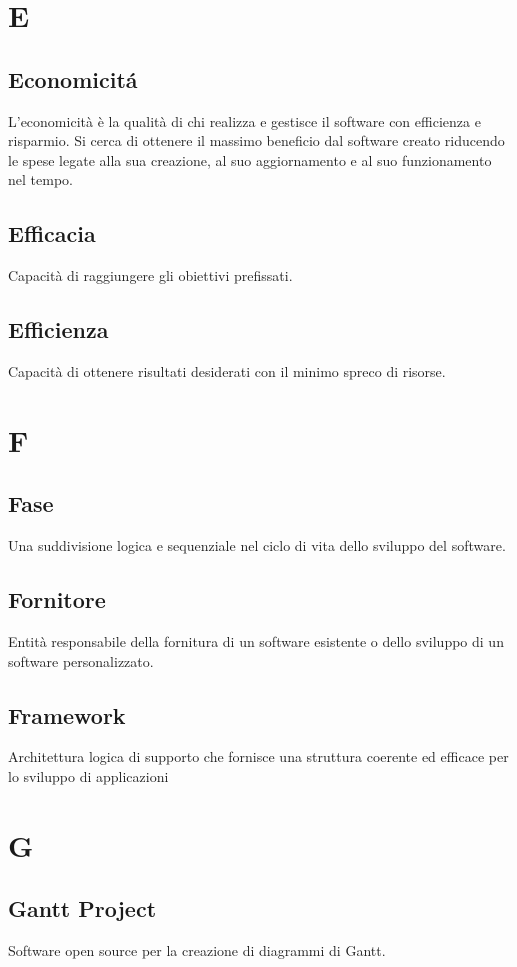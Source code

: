 \documentclass[12pt]{article}
\begin{document}
	\clearpage
	\section{E}
		\subsection{Economicit\'a}
			L’economicità è la qualità di chi realizza e gestisce il software con efficienza e risparmio. Si cerca di ottenere il massimo beneficio dal software creato riducendo le spese legate alla sua creazione, al suo aggiornamento e al suo funzionamento nel tempo.
		\subsection{Efficacia}
			Capacità di raggiungere gli obiettivi prefissati.
		\subsection{Efficienza}
			Capacità di ottenere risultati desiderati con il minimo spreco di risorse.
	\clearpage
	\section{F}
		\subsection{Fase}
			Una suddivisione logica e sequenziale nel ciclo di vita dello sviluppo del software.
		\subsection{Fornitore}
			Entità responsabile della fornitura di un software esistente o dello sviluppo di un software personalizzato.
		\subsection{Framework} %
			Architettura logica di supporto che fornisce una struttura coerente ed efficace per lo sviluppo di applicazioni

	\clearpage
	\section{G}
		\subsection{Gantt Project}
			Software open source per la creazione di diagrammi di Gantt.
\end{document}
